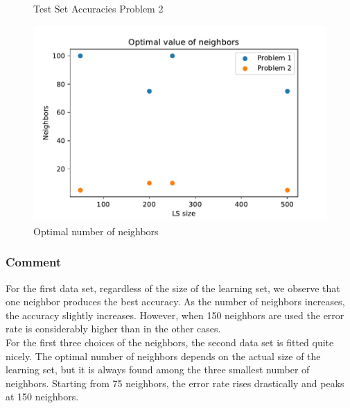\documentclass{article}
\begin{document}
\begin{figure}[H]
	
	\caption{\label{acc2.3p2}Test Set Accuracies Problem 2}
	
\end{figure}
\begin{figure}[H]
	\centering
\includegraphics[width=\picwidth]{plots/neighbors/2.3/optimal_values.pdf}
	\caption{\label{acc2.3p2}Optimal number of neighbors}
	
\end{figure}
\subsubsection{Comment}
For the first data set, regardless of the size of the learning set, we observe that one neighbor produces the best accuracy. As the number of neighbors increases, the accuracy slightly increases. However, when 150 neighbors are used the error rate is considerably higher than in the other cases. \\
For the first three choices of the neighbors, the second data set is fitted quite nicely. The optimal number of neighbors depends on the actual size of the learning set, but it is always found among the three smallest number of neighbors. Starting from 75 neighbors, the error rate rises drastically and peaks at 150 neighbors.
\end{document}
